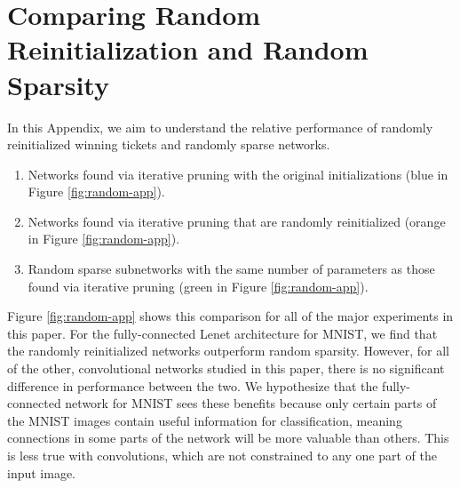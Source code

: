 \section{Comparing Random Reinitialization and Random Sparsity}
\label{app:random}

In this Appendix, we aim to understand the relative performance of randomly reinitialized winning tickets and randomly sparse networks.
\begin{enumerate}
\item Networks found via iterative pruning with the original initializations (blue in Figure \ref{fig:random-app}).
\item Networks found via iterative pruning that are randomly reinitialized (orange in Figure \ref{fig:random-app}).
\item Random sparse subnetworks with the same number of parameters as those found via iterative pruning (green in Figure \ref{fig:random-app}).
\end{enumerate}

Figure \ref{fig:random-app} shows this comparison for all of the major experiments in this paper. For the fully-connected Lenet
architecture for MNIST, we find that the randomly reinitialized networks outperform random sparsity. However, for all of the other,
convolutional networks studied in this paper, there is no significant difference in performance between the two. We hypothesize that
the fully-connected network for MNIST sees these benefits because only certain parts of the MNIST images contain useful information
for classification, meaning connections in some parts of the network will be more valuable than others. This is less true with
convolutions, which are not constrained to any one part of the input image.

